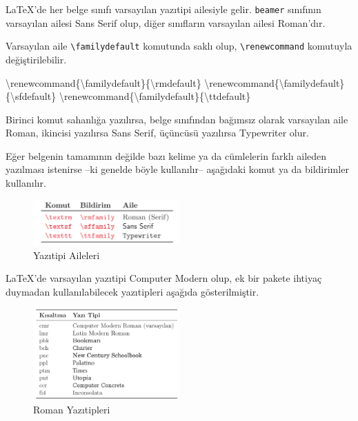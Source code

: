 \documentclass[
  10pt,
]{scrbook}
\newenvironment{Shaded}{}{}
\newcommand{\ExtensionTok}[1]{#1}
\newcommand{\FunctionTok}[1]{\textcolor[rgb]{0.02,0.16,0.49}{#1}}
\newcommand{\NormalTok}[1]{#1}
\theoremstyle{definition}
\theoremstyle{definition}
\theoremstyle{definition}
\theoremstyle{definition}
\theoremstyle{remark}
\begin{document}
LaTeX'de her belge sınıfı varsayılan yazıtipi ailesiyle gelir. \texttt{beamer} sınıfının varsayılan ailesi Sans Serif olup, diğer sınıfların varsayılan ailesi Roman'dır.

Varsayılan aile \texttt{\textbackslash{}familydefault} komutunda saklı olup, \texttt{\textbackslash{}renewcommand} komutuyla değiştirilebilir.

\begin{Shaded}
\begin{Highlighting}[]
\FunctionTok{\textbackslash{}renewcommand}\NormalTok{\{}\ExtensionTok{\textbackslash{}familydefault}\NormalTok{\}\{}\FunctionTok{\textbackslash{}rmdefault}\NormalTok{\}  }
\FunctionTok{\textbackslash{}renewcommand}\NormalTok{\{}\ExtensionTok{\textbackslash{}familydefault}\NormalTok{\}\{}\FunctionTok{\textbackslash{}sfdefault}\NormalTok{\}  }
\FunctionTok{\textbackslash{}renewcommand}\NormalTok{\{}\ExtensionTok{\textbackslash{}familydefault}\NormalTok{\}\{}\FunctionTok{\textbackslash{}ttdefault}\NormalTok{\} }
\end{Highlighting}
\end{Shaded}

Birinci komut sahanlığa yazılırsa, belge sınıfından bağımsız olarak varsayılan aile Roman, ikincisi yazılırsa Sans Serif, üçüncüsü yazılırsa Typewriter olur.

Eğer belgenin tamamının değilde bazı kelime ya da cümlelerin farklı aileden yazılması istenirse --ki genelde böyle kullanılır-- aşağıdaki komut ya da bildirimler kullanılır.

\begin{figure}
\centering
\includegraphics[width=0.5\textwidth,height=\textheight]{images/yazitipi.png}
\caption{Yazıtipi Aileleri}
\end{figure}

LaTeX'de varsayılan yazıtipi Computer Modern olup, ek bir pakete ihtiyaç duymadan kullanılabilecek yazıtipleri aşağıda gösterilmiştir.

\begin{figure}
\centering
\includegraphics[width=0.5\textwidth,height=\textheight]{images/yazitipi2.png}
\caption{Roman Yazıtipleri}
\end{figure}
\end{document}
